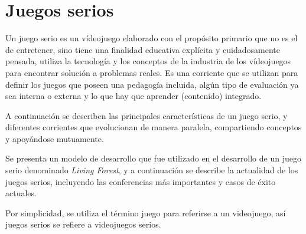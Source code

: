 \chapter{Juegos serios}


Un juego serio es un vídeojuego elaborado con el propósito primario que no es el
de entretener\cite{sg:aoverview}, sino tiene una finalidad educativa explícita y
cuidadosamente pensada, utiliza la tecnología y los conceptos de la industria de
los vídeojuegos para encontrar solución a problemas reales. Es una corriente que
se utilizan para definir los juegos que poseen una pedagogía incluida, algún
tipo de evaluación ya sea interna o externa y lo que hay que aprender
(contenido) integrado\cite{damien:sg}.

A continuación se describen las principales características de un juego serio, y
diferentes corrientes que evolucionan de manera paralela, compartiendo conceptos
y apoyándose mutuamente.

Se presenta un modelo de desarrollo que fue utilizado en el desarrollo de un
juego serio denominado \textit{Living Forest}, y a continuación se describe la
actualidad de los juegos serios, incluyendo las conferencias más importantes y
casos de éxito actuales.

Por simplicidad, se utiliza el término juego para referirse a un videojuego, así
juegos serios se refiere a videojuegos serios.








